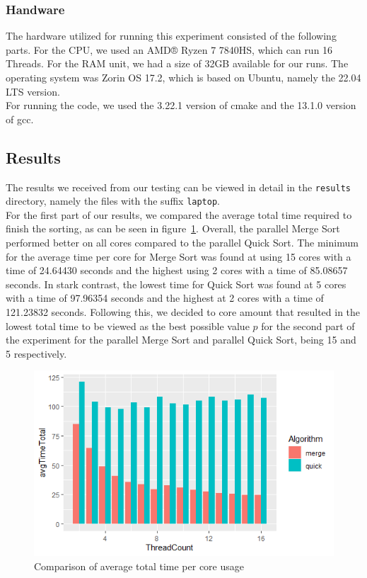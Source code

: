 \documentclass[twocolumn]{article}
\begin{document}
\subsubsection{Handware}
The hardware utilized for running this experiment consisted of the following parts. For the CPU, we used an AMD® Ryzen 7 7840HS, which can run 16 Threads. For the RAM unit, we had a size of 32GB available for our runs. The operating system was Zorin OS 17.2, which is based on Ubuntu, namely the 22.04 LTS version.\\
For running the code, we used the 3.22.1 version of cmake and the 13.1.0 version of gcc.


\subsection{Results}%
The results we received from our testing can be viewed in detail in the \texttt{results} directory, namely the files with the suffix \texttt{laptop}.\\
For the first part of our results, we compared the average total time required to finish the sorting, as can be seen in figure~\ref{fig:exp1_totalTime}. Overall, the parallel Merge Sort performed better on all cores compared to the parallel Quick Sort. The minimum for the average time per core for Merge Sort was found at using 15 cores with a time of 24.64430 seconds and the highest using 2 cores with a time of 85.08657 seconds. In stark contrast, the lowest time for Quick Sort was found at 5 cores with a time of 97.96354 seconds and the highest at 2 cores with a time of 121.23832 seconds. Following this, we decided to core amount that resulted in the lowest total time to be viewed as the best possible value $p$ for the second part of the experiment for the parallel Merge Sort and parallel Quick Sort, being 15 and 5 respectively.

\begin{figure}[h]
	\includegraphics[scale=0.5]{./figures/exp1_comparison_totaltime.png}
	\centering
	\caption{Comparison of average total time per core usage}
	\label{fig:exp1_totalTime}
\end{figure}
\end{document}
